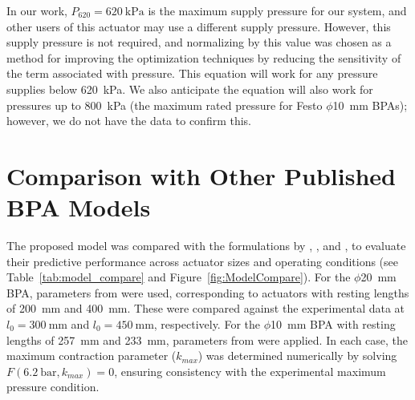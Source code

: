 In our work, $P_{620}=\qty{620}{\kPa}$ is the maximum supply pressure for our system, and other users of this actuator may use a different supply pressure. However, this supply pressure is not required, and normalizing by this value was chosen as a method for improving the optimization techniques by reducing the sensitivity of the term associated with pressure. This equation will work for any pressure supplies below \qty{620}{\kPa}. We also anticipate the equation will also work for pressures up to \qty{800}{\kPa} (the maximum rated pressure for Festo $\phi$\qty{10}{\mm} BPAs); however, we do not have the data to confirm this.

\section{Comparison with Other Published BPA Models}

The proposed model was compared with the formulations by \citet{sarosi_new_2012}, \citet{sarosi_10mm}, and \citet{martens_modeling_2017}, to evaluate their predictive performance across actuator sizes and operating conditions (see Table~\ref{tab:model_compare} and Figure~\ref{fig:ModelCompare}).
For the $\phi$\qty{20}{\mm} BPA, parameters from \cite{sarosi_new_2012} were used, corresponding to actuators with resting lengths of \qty{200}{\mm} and \qty{400}{\mm}. These were compared against the experimental data at $l_0=\qty{300}{\mm}$ and $l_0=\qty{450}{\mm}$, respectively. For the $\phi$\qty{10}{\mm} BPA with resting lengths of \qty{257}{\mm} and \qty{233}{\mm}, parameters from \cite{sarosi_10mm} were applied. In each case, the maximum contraction parameter ($k_{max}$) was determined numerically by solving $F(\qty{6.2}{\bar}, k_{max}) = 0$, ensuring consistency with the experimental maximum pressure condition.





